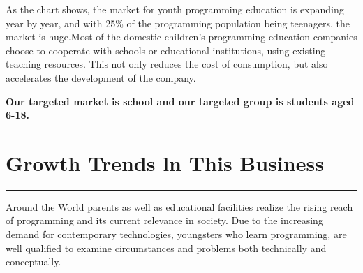 \documentclass[12pt]{extarticle}
\numberwithin{figure}{section}
\begin{document}
As the chart shows, the market for youth programming education is expanding year by year, and with 25\% of the programming population being teenagers, the market is huge.Most of the domestic children's programming education companies choose to cooperate with schools or educational institutions, using existing teaching resources. This not only reduces the cost of consumption, but also accelerates the development of the company.

\textbf{Our targeted market is school and our targeted group is students aged 6-18.}
\begin{figure}[ht]
    \centering
    \hspace{10mm}
\end{figure}

\newpage
\section{Growth Trends ln This Business}
\vspace{-0.1cm}
\hrule
\vspace{0.2cm}
Around the World parents as well as educational facilities realize the rising reach of programming and its current relevance in society. Due to the increasing demand for contemporary technologies, youngsters who learn programming, are well qualified to examine circumstances and problems both technically and conceptually.
\end{document}
